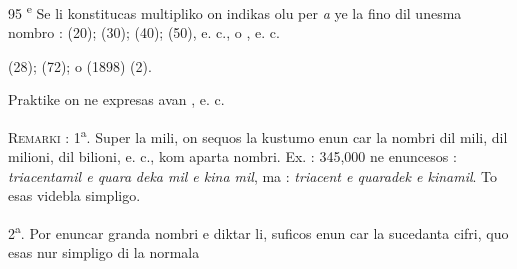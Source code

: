 \begin{VUpage}[99]{95}
\textsuperscript{e} Se li konstitucas multipliko on indikas olu per \textit{a} ye\nl
la fino dil unesma nombro :  (20);  (30);\nl
{} (40);  (50), e. c., o \nl
{}, e. c.

 (28);  (72); o \nl
{} (1898) (2).

Praktike on ne expresas  avan , e. c.

\VUblancAlinea
\textsc{Remarki} : 1\textsuperscript{a}. Super la mili, on sequos la kustumo enun\cc
car la nombri dil mili, dil milioni, dil bilioni, e. c., kom aparta\nl
nombri. Ex. : 345,000 ne enuncesos : \textit{triacentamil e quara}\cc
\textit{deka mil e kina mil}, ma : \textit{triacent e quaradek e kinamil}. To\nl
esas videbla simpligo.

2\textsuperscript{a}. Por enuncar granda nombri e diktar li, suficos enun\cc
car la sucedanta cifri, quo esas nur simpligo di la normala\parplein
\end{VUpage}

